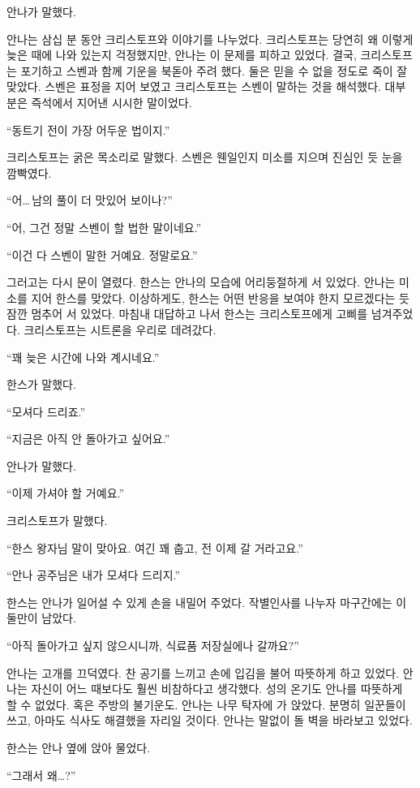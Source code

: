 안나가 말했다.

안나는 삼십 분 동안 크리스토프와 이야기를 나누었다. 크리스토프는 당연히 왜 이렇게 늦은 때에 나와 있는지 걱정했지만, 안나는 이 문제를 피하고 있었다. 결국, 크리스토프는 포기하고 스벤과 함께 기운을 북돋아 주려 했다. 둘은 믿을 수 없을 정도로 죽이 잘 맞았다. 스벤은 표정을 지어 보였고 크리스토프는 스벤이 말하는 것을 해석했다. 대부분은 즉석에서 지어낸 시시한 말이었다.

``동트기 전이 가장 어두운 법이지.''

크리스토프는 굵은 목소리로 말했다. 스벤은 웬일인지 미소를 지으며 진심인 듯 눈을 깜빡였다.

``어\ldots\,남의 풀이 더 맛있어 보이나?''

``어, 그건 정말 스벤이 할 법한 말이네요.''

``이건 다 스벤이 말한 거예요. 정말로요.''

그러고는 다시 문이 열렸다. 한스는 안나의 모습에 어리둥절하게 서 있었다. 안나는 미소를 지어 한스를 맞았다. 이상하게도, 한스는 어떤 반응을 보여야 한지 모르겠다는 듯 잠깐 멈추어 서 있었다. 마침내 대답하고 나서 한스는 크리스토프에게 고삐를 넘겨주었다. 크리스토프는 시트론을 우리로 데려갔다.

``꽤 늦은 시간에 나와 계시네요.''

한스가 말했다.

``모셔다 드리죠.''

``지금은 아직 안 돌아가고 싶어요.''

안나가 말했다.

``이제 가셔야 할 거예요.''

크리스토프가 말했다.

``한스 왕자님 말이 맞아요. 여긴 꽤 춥고, 전 이제 갈 거라고요.''

``안나 공주님은 내가 모셔다 드리지.''

한스는 안나가 일어설 수 있게 손을 내밀어 주었다. 작별인사를 나누자 마구간에는 이 둘만이 남았다.

``아직 돌아가고 싶지 않으시니까, 식료품 저장실에나 갈까요?''

안나는 고개를 끄덕였다. 찬 공기를 느끼고 손에 입김을 불어 따뜻하게 하고 있었다. 안나는 자신이 어느 때보다도 훨씬 비참하다고 생각했다. 성의 온기도 안나를 따뜻하게 할 수 없었다. 혹은 주방의 불기운도. 안나는 나무 탁자에 가 앉았다. 분명히 일꾼들이 쓰고, 아마도 식사도 해결했을 자리일 것이다. 안나는 말없이 돌 벽을 바라보고 있었다.

한스는 안나 옆에 앉아 물었다.

``그래서 왜\ldots?''

